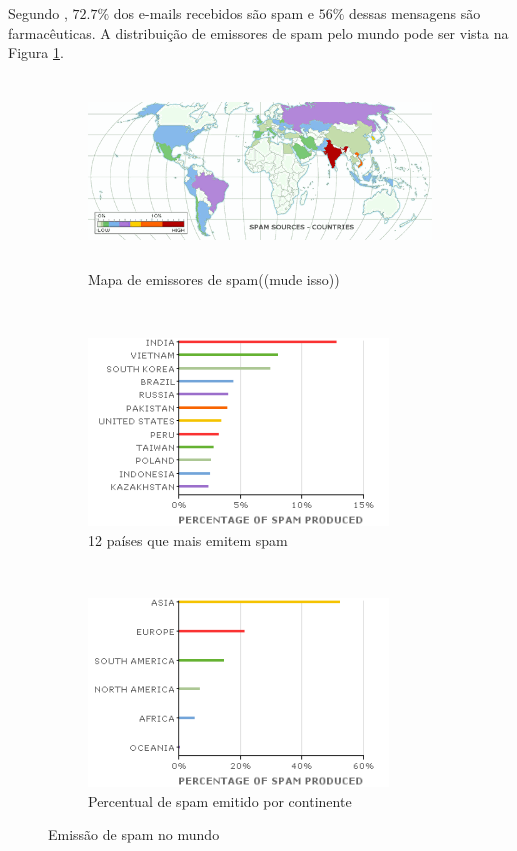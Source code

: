 \documentclass[a4paper,dvipdfm]{article}
\begin{document}
\begin{description}
		Segundo , $72.7\%$ dos e-mails recebidos são spam e $56\%$ dessas mensagens são farmacêuticas.
		A distribuição de emissores de spam pelo mundo pode ser vista na Figura \ref{fig:spamworld}.

	\begin{figure}[ht]
		\begin{subfigure}[b]{\textwidth}
			\centering
			\includegraphics[height=5cm]{Imagens/m86security/spam-country-map.png}
			\caption{Mapa de emissores de spam((mude isso))}
		\end{subfigure}
		~
		\begin{subfigure}[b]{0.47\textwidth}
			\centering
			\includegraphics[height=5cm]{Imagens/m86security/spam-country-bar.png}
			\caption{12 países que mais emitem spam}
		\end{subfigure}
		~
		\begin{subfigure}[b]{0.47\textwidth}
			\centering
			\includegraphics[height=5cm]{Imagens/m86security/spam-continent-bar.png}
			\caption{Percentual de spam emitido por continente}
		\end{subfigure}
		\caption{Emissão de spam no mundo}
		\label{fig:spamworld}
	\end{figure}


\end{description}
\end{document}
